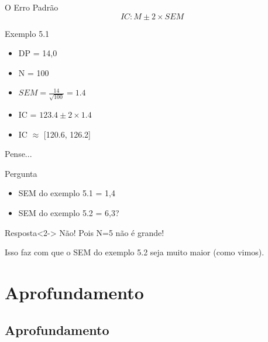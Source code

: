 \documentclass{beamer}
\begin{document}
\begin{frame}{O Erro Padrão}
  \begin{displaymath}
    IC: M \pm 2 \times SEM
  \end{displaymath}
  \begin{exampleblock}{Exemplo 5.1}
    \begin{itemize}
    \item DP = 14,0
    \item N = 100
    \item $SEM = \frac{14}{\sqrt{100}} = 1.4$
    \item IC =  $123.4 \pm 2 \times 1.4$
    \item IC $\approx$ [120.6, 126.2]
    \end{itemize}
  \end{exampleblock}
\end{frame}

\begin{frame}{Pense...}
  \begin{block}{Pergunta}
  \begin{itemize}
  \item SEM do exemplo 5.1 = 1,4
  \item SEM do exemplo 5.2 = 6,3?
  \end{itemize}
  \end{block}
  \begin{block}{Resposta}<2->
    Não! Pois N=5 não é grande!

    \bigskip
    Isso faz com que o SEM do exemplo 5.2 seja muito maior (como vimos).
  \end{block}
\end{frame}

\section{Aprofundamento}

\subsection{Aprofundamento}
\end{document}
